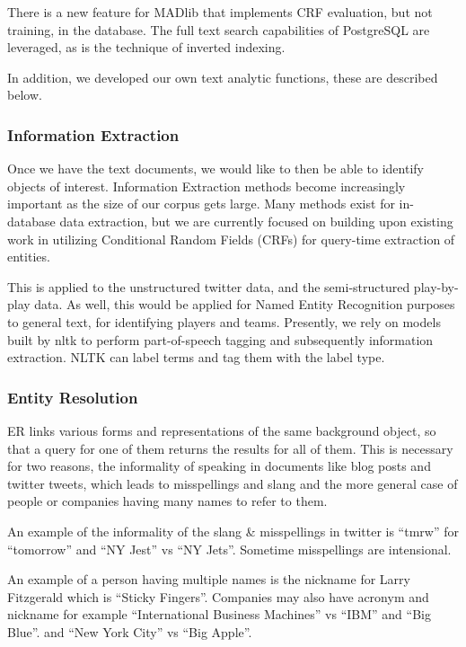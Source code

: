 \documentclass[11pt]{article}
\begin{document}
  There is a new feature for MADlib that implements CRF evaluation, but not 
	training, in the database.
  The full text search capabilities of PostgreSQL are leveraged,
  as is the technique of inverted indexing.

	In addition, we developed our own text analytic functions, these are
	described below.

    \subsubsection{Information Extraction}

    Once we have the text documents, we would like to then be able to identify
    objects of interest. Information Extraction methods become increasingly
    important as the size of our corpus gets large. Many methods exist for in-database data
    extraction, but we are currently focused on building upon existing work in
    utilizing Conditional Random Fields (CRFs) for query-time extraction of
    entities.

    This is applied to the unstructured twitter data,
    and the semi-structured play-by-play data.
    As well, this would be applied for Named Entity Recognition purposes to general text, for identifying players and teams.
		Presently, we rely on models built by nltk to perform part-of-speech 
		tagging and subsequently information extraction. NLTK can label 
		terms and tag them with the label type. 


    \subsubsection{Entity Resolution}
    \label{sec:SCER}

    ER links various forms and representations of the same background object,
    so that a query for one of them returns the results for all of them.
    This is necessary for two reasons,
    the informality of speaking in documents like blog posts and twitter tweets,
    which leads to misspellings and slang
    and the more  general case of people or companies having many names to refer to them.

    An example of the informality of the slang \& misspellings in twitter is
		``tmrw'' for ``tomorrow'' and ``NY Jest'' vs ``NY Jets''. Sometime 
		misspellings are intensional.

    An example of a person having multiple names is the
    nickname for Larry Fitzgerald which is ``Sticky Fingers''.
		Companies may also have acronym and nickname
    for example ``International Business Machines'' vs ``IBM'' and ``Big Blue''.
    and ``New York City'' vs ``Big Apple''.
\end{document}
